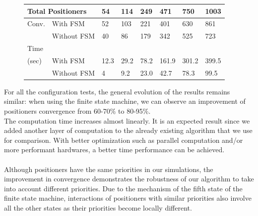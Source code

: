 \documentclass[]{spie}  %
\begin{document}
\begin{figure}[H]
\begin{minipage}{9cm}
{				\tiny
				\begin{tabular}{|l|l|l|l|l|l|l|l|}
					\hline
					\multicolumn{2}{|l|}{Total Positioners}  & 54 & 114 & 249 & 471 & 750 & 1003\\
					\hline
					Conv. & With FSM  & 52 & 103 & 221 & 401 & 630 & 861 \\
					\cline{2-8}
					& Without FSM & 40  & 86 & 179 & 342 & 525 & 723 \\
					\hline
					Time\\(sec) & With FSM  & 12.3 & 29.2 & 78.2 & 161.9 & 301.2 & 399.5 \\
					\cline{2-8}
					& Without FSM  & 4  & 9.2 & 23.0 & 42.7 & 78.3  & 99.5 \\
					\hline
				\end{tabular}}
				\label{configuration8_result} 
			\end{minipage}
		\end{figure}					
	For all the configuration tests, the general evolution of the results remains similar: when using the finite state machine, we can observe an improvement of positioners convergence from 60-70\% to 80-95\%.\\
	The computation time increases almost linearly. It is an expected result since we added another layer of computation to the already existing algorithm that we use for comparison. With better optimization such as parallel computation and/or more performant hardwares, a better time performance can be achieved.\\\\
	 Although positioners have the same priorities in our simulations, the improvement in convergence demonstrates the robustness of our algorithm to take into account different priorities. Due to the mechanism of the fifth state of the finite state machine, interactions of positioners with similar priorities also involve all the other states as their priorities become locally different. 	
\end{document}
